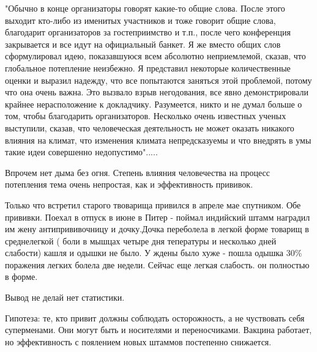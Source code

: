 "Обычно в конце организаторы говорят какие-то общие слова. После этого выходит
кто-либо из именитых участников и тоже говорит общие слова, благодарит
организаторов за гостеприимство и т.п., после чего конференция закрывается и
все идут на официальный банкет. Я же вместо общих слов сформулировал идею,
показавшуюся всем абсолютно неприемлемой, сказав, что глобальное потепление
неизбежно. Я представил некоторые количественные оценки и выразил надежду, что
все попытаются заняться этой проблемой, потому что она очень важна. Это вызвало
взрыв негодования, все явно демонстрировали крайнее нерасположение к
докладчику. Разумеется, никто и не думал больше о том, чтобы благодарить
организаторов. Несколько очень известных ученых выступили, сказав, что
человеческая деятельность не может оказать никакого влияния на климат, что
изменения климата непредсказуемы и что внедрять в умы такие идеи совершенно
недопустимо".....

Впрочем нет дыма без огня. Степень влияния человечества на процесс потепления тема очень непростая, как и эффективность прививок.

Только что встретил  старого твоварища привился в апреле мае спутником. Обе
прививки. Поехал в отпуск в июне в Питер - поймал индийский штамм наградил им
жену антипрививочницу и дочку.Дочка переболела в легкой форме товарищ в
среднелегкой ( боли в мышцах четыре  дня  тепературы  и несколько дней
слабости) кашля и одышки не было. У ждены было хуже - пошла одышка 30\%
поражения легких болела две недели. Сейчас еще легкая слабость. он полностью в
форме.

Вывод не делай нет статистики.

Гипотеза:  те, кто привит должны соблюдать осторожность, а не чуствовать себя
суперменами. Они могут быть и носителями и переносчиками. Вакцина работает, но
эффективность с поялением новых штаммов постепенно  снижается.
